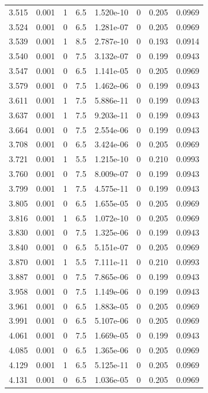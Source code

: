 \documentclass[preview]{standalone}
\begin{document}
{{{{\begin{tabular}{L{1.2cm}C{1.2cm} C{0.3cm}C{0.5cm} C{1.4cm}C{1.4cm} C{1.4cm}C{1.4cm}}
  3.515  &  0.001  & 1     & 6.5 &  1.520e-10  & 0  & 0.205 &  0.0969   \\ 
  3.524  &  0.001  & 0     & 6.5 &  1.281e-07  & 0  & 0.205 &  0.0969   \\ 
  3.539  &  0.001  & 1     & 8.5 &  2.787e-10  & 0  & 0.193 &  0.0914   \\ 
  3.540  &  0.001  & 0     & 7.5 &  3.132e-07  & 0  & 0.199 &  0.0943   \\ 
  3.547  &  0.001  & 0     & 6.5 &  1.141e-05  & 0  & 0.205 &  0.0969   \\ 
  3.579  &  0.001  & 0     & 7.5 &  1.462e-06  & 0  & 0.199 &  0.0943   \\ 
  3.611  &  0.001  & 1     & 7.5 &  5.886e-11  & 0  & 0.199 &  0.0943   \\ 
  3.637  &  0.001  & 1     & 7.5 &  9.203e-11  & 0  & 0.199 &  0.0943   \\ 
  3.664  &  0.001  & 0     & 7.5 &  2.554e-06  & 0  & 0.199 &  0.0943   \\ 
  3.708  &  0.001  & 0     & 6.5 &  3.424e-06  & 0  & 0.205 &  0.0969   \\ 
  3.721  &  0.001  & 1     & 5.5 &  1.215e-10  & 0  & 0.210 &  0.0993   \\ 
  3.760  &  0.001  & 0     & 7.5 &  8.009e-07  & 0  & 0.199 &  0.0943   \\ 
  3.799  &  0.001  & 1     & 7.5 &  4.575e-11  & 0  & 0.199 &  0.0943   \\ 
  3.805  &  0.001  & 0     & 6.5 &  1.655e-05  & 0  & 0.205 &  0.0969   \\ 
  3.816  &  0.001  & 1     & 6.5 &  1.072e-10  & 0  & 0.205 &  0.0969   \\ 
  3.830  &  0.001  & 0     & 7.5 &  1.325e-06  & 0  & 0.199 &  0.0943   \\ 
  3.840  &  0.001  & 0     & 6.5 &  5.151e-07  & 0  & 0.205 &  0.0969   \\ 
  3.870  &  0.001  & 1     & 5.5 &  7.111e-11  & 0  & 0.210 &  0.0993   \\ 
  3.887  &  0.001  & 0     & 7.5 &  7.865e-06  & 0  & 0.199 &  0.0943   \\ 
  3.958  &  0.001  & 0     & 7.5 &  1.149e-06  & 0  & 0.199 &  0.0943   \\ 
  3.961  &  0.001  & 0     & 6.5 &  1.883e-05  & 0  & 0.205 &  0.0969   \\ 
  3.991  &  0.001  & 0     & 6.5 &  5.107e-06  & 0  & 0.205 &  0.0969   \\ 
  4.061  &  0.001  & 0     & 7.5 &  1.669e-05  & 0  & 0.199 &  0.0943   \\ 
  4.085  &  0.001  & 0     & 6.5 &  1.365e-06  & 0  & 0.205 &  0.0969   \\ 
  4.129  &  0.001  & 1     & 6.5 &  5.125e-11  & 0  & 0.205 &  0.0969   \\ 
  4.131  &  0.001  & 0     & 6.5 &  1.036e-05  & 0  & 0.205 &  0.0969   \\ 
\hline 
\end{tabular} 

}}}}
\end{document}

